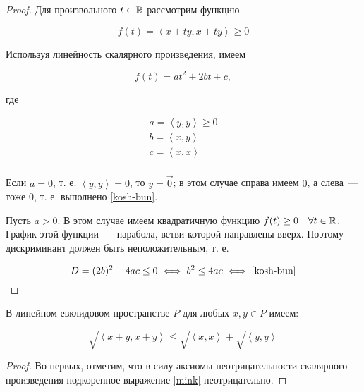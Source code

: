 \documentclass[../../main.tex]{subfiles}
\begin{document}
\begin{proof}
 Для произвольного $t \in \mathbb{R}$ рассмотрим функцию
 
 \[f(t) = \left<x + ty, x + ty\right> \ge 0\]

 Используя линейность скалярного произведения, имеем
 
 \[f(t) = at^2 + 2bt + c,\]
 
 где
 
 \[
   \begin{array}{c}
    a = \left<y, y\right> \ge 0 \\
    b = \left<x, y\right> \\
    c = \left<x, x\right> \\
   \end{array}
 \]
 
 Если $a = 0$, т. е. $\left<y, y\right> = 0$, то $y = \vec 0$; в этом 
 случае справа имеем $0$, а слева~--- тоже $0$, т. е. выполнено 
 \eqref{kosh-bun}.
 
 Пусть $a > 0$. В этом случае имеем квадратичную функцию $f(t) \ge 0 
 \quad \forall t \in \mathbb{R}$. График этой функции~--- парабола, ветви 
 которой направлены вверх. Поэтому дискриминант должен быть 
 неположительным, т. е.
 
 \[
   D = (2b)^2 - 4ac \le 0 \iff b^2 \le 4ac \iff \eqref{kosh-bun} 
   \qedhere
 \]

\end{proof}

\begin{crl*}
 В линейном евклидовом пространстве $P$ для любых $x, y \in P$ имеем:
 
 \begin{equation}
  \label{mink}
  \sqrt{\left<x+y, x+y\right>} \le \sqrt{\left<x, x\right>} + 
  \sqrt{\left<y, y\right>}
 \end{equation}

\end{crl*}

\begin{proof}
 Во-первых, отметим, что в силу аксиомы неотрицательности скалярного произведения подкоренное выражение \eqref{mink} неотрицательно.
\end{proof}
\end{document}
